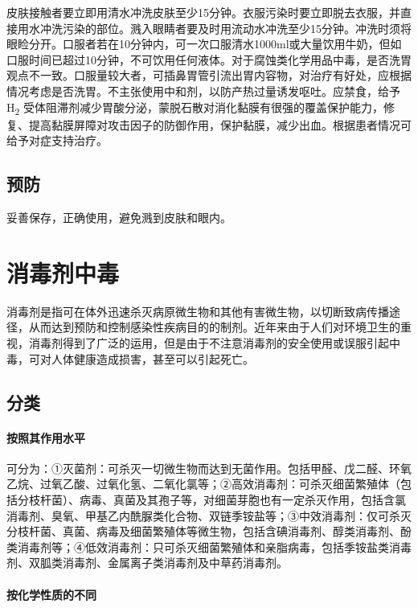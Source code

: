 皮肤接触者要立即用清水冲洗皮肤至少15分钟。衣服污染时要立即脱去衣服，并直接用水冲洗污染的部位。溅入眼睛者要及时用流动水冲洗至少15分钟。冲洗时须将眼睑分开。口服者若在10分钟内，可一次口服清水1000ml或大量饮用牛奶，但如口服时间已超过10分钟，不可饮用任何液体。对于腐蚀类化学用品中毒，是否洗胃观点不一致。口服量较大者，可插鼻胃管引流出胃内容物，对治疗有好处，应根据情况考虑是否洗胃。不主张使用中和剂，以防产热过量诱发呕吐。应禁食，给予H\textsubscript{2}
受体阻滞剂减少胃酸分泌，蒙脱石散对消化黏膜有很强的覆盖保护能力，修复、提高黏膜屏障对攻击因子的防御作用，保护黏膜，减少出血。根据患者情况可给予对症支持治疗。

\subsection{预防}

妥善保存，正确使用，避免溅到皮肤和眼内。

\protect\hypertarget{text00188.html}{}{}

\section{消毒剂中毒}

消毒剂是指可在体外迅速杀灭病原微生物和其他有害微生物，以切断致病传播途径，从而达到预防和控制感染性疾病目的的制剂。近年来由于人们对环境卫生的重视，消毒剂得到了广泛的运用，但是由于不注意消毒剂的安全使用或误服引起中毒，可对人体健康造成损害，甚至可以引起死亡。

\subsection{分类}

\paragraph{按照其作用水平}

可分为：①灭菌剂：可杀灭一切微生物而达到无菌作用。包括甲醛、戊二醛、环氧乙烷、过氧乙酸、过氧化氢、二氧化氯等；②高效消毒剂：可杀灭细菌繁殖体（包括分枝杆菌）、病毒、真菌及其孢子等，对细菌芽胞也有一定杀灭作用，包括含氯消毒剂、臭氧、甲基乙内酰脲类化合物、双链季铵盐等；③中效消毒剂：仅可杀灭分枝杆菌、真菌、病毒及细菌繁殖体等微生物，包括含碘消毒剂、醇类消毒剂、酚类消毒剂等；④低效消毒剂：只可杀灭细菌繁殖体和亲脂病毒，包括季铵盐类消毒剂、双胍类消毒剂、金属离子类消毒剂及中草药消毒剂。

\paragraph{按化学性质的不同}


